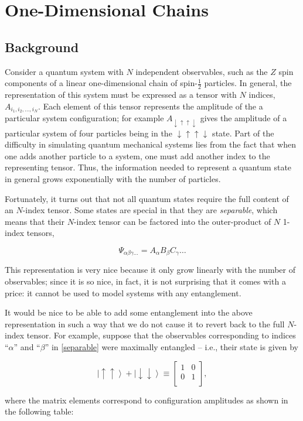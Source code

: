 \documentclass{amsbook}
\theoremstyle{plain}
\theoremstyle{definition}
\theoremstyle{remark}
\newcommand{\bmat}[4]{
\begin{bmatrix}
#1 & #2\\
#3 & #4\\
\end{bmatrix}
}
\newcommand{\eqn}[2][]{\begin{equation}\label{#1}#2\end{equation}}
\newcommand{\half}{\frac{1}{2}}
\newcommand{\ket}[1]{\left|#1\right>}
\begin{document}
\section{One-Dimensional Chains}
\subsection{Background}

Consider a quantum system with $N$ independent observables, such as the $Z$ spin components of a linear one-dimensional chain of spin-$\half$ particles.  In general, the representation of this system must be expressed as a tensor with $N$ indices, $A_{i_1,i_2,\dots,i_N}$.  Each element of this tensor represents the amplitude of the a particular system configuration; for example $A_{\downarrow\uparrow\uparrow\downarrow}$ gives the amplitude of a particular system of four particles being in the $\downarrow\uparrow\uparrow\downarrow$ state.  Part of the difficulty in simulating quantum mechanical systems lies from the fact that when one adds another particle to a system, one must add another index to the representing tensor.  Thus, the information needed to represent a quantum state in general grows exponentially with the number of particles.

Fortunately, it turns out that not all quantum states require the full content of an $N$-index tensor.  Some states are special in that they are \textit{separable}, which means that their $N$-index tensor can be factored into the outer-product of $N$ 1-index tensors,

\eqn[separable]{\Psi_{\alpha\beta\gamma\dots} = A_\alpha B_\beta C_\gamma \dots}

This representation is very nice because it only grow linearly with the number of observables;  since it is so nice, in fact, it is not surprising that it comes with a price:  it cannot be used to model systems with any entanglement.

It would be nice to be able to add some entanglement into the above representation in such a way that we do not cause it to revert back to the full $N$-index tensor.  For example, suppose that the observables corresponding to indices ``$\alpha$'' and ``$\beta$'' in \eqref{separable} were maximally entangled -- i.e., their state is given by

$$\ket{\uparrow\uparrow}+\ket{\downarrow\downarrow} \equiv
\bmat{1}{0}{0}{1},
$$

\noindent where the matrix elements correspond to configuration amplitudes as shown in the following table:
\end{document}
